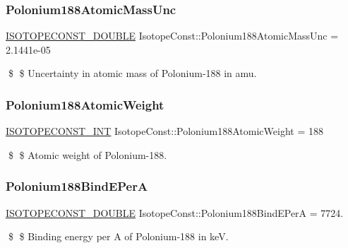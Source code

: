\subsubsection{\texorpdfstring{Polonium188\+Atomic\+Mass\+Unc}{Polonium188AtomicMassUnc}}
{\footnotesize\ttfamily \mbox{\hyperlink{group___isotope_const-_macros_ga8f45a7272ce02c0b4c65c44636ed719a}{I\+S\+O\+T\+O\+P\+E\+C\+O\+N\+S\+T\+\_\+\+D\+O\+U\+B\+LE}} Isotope\+Const\+::\+Polonium188\+Atomic\+Mass\+Unc = 2.\+1441e-\/05}

\$ \$ Uncertainty in atomic mass of Polonium-\/188 in amu. \mbox{\label{group___isotope_const-_polonium-_po188_ga12de10468719f3c2f981e4b4cc9183b1}} 
\subsubsection{\texorpdfstring{Polonium188\+Atomic\+Weight}{Polonium188AtomicWeight}}
{\footnotesize\ttfamily \mbox{\hyperlink{group___isotope_const-_macros_ga5f18360b3e99483a35c32d789e62621c}{I\+S\+O\+T\+O\+P\+E\+C\+O\+N\+S\+T\+\_\+\+I\+NT}} Isotope\+Const\+::\+Polonium188\+Atomic\+Weight = 188}

\$ \$ Atomic weight of Polonium-\/188. \mbox{\label{group___isotope_const-_polonium-_po188_ga22a8c8cfb7ccbfae67369ef4f1938f10}} 
\subsubsection{\texorpdfstring{Polonium188\+Bind\+E\+PerA}{Polonium188BindEPerA}}
{\footnotesize\ttfamily \mbox{\hyperlink{group___isotope_const-_macros_ga8f45a7272ce02c0b4c65c44636ed719a}{I\+S\+O\+T\+O\+P\+E\+C\+O\+N\+S\+T\+\_\+\+D\+O\+U\+B\+LE}} Isotope\+Const\+::\+Polonium188\+Bind\+E\+PerA = 7724.}

\$ \$ Binding energy per A of Polonium-\/188 in keV. \mbox{\label{group___isotope_const-_polonium-_po188_ga11160d514e5717e0207f0b3419f30ae1}} 

